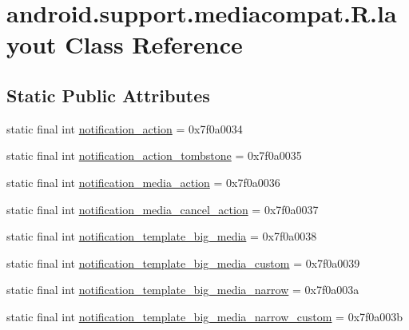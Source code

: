 \hypertarget{classandroid_1_1support_1_1mediacompat_1_1_r_1_1layout}{}\section{android.\+support.\+mediacompat.\+R.\+layout Class Reference}
\label{classandroid_1_1support_1_1mediacompat_1_1_r_1_1layout}
\subsection*{Static Public Attributes}
\begin{DoxyCompactItemize}
\item 
static final int \mbox{\hyperlink{classandroid_1_1support_1_1mediacompat_1_1_r_1_1layout_ab25d299914399f971acb340817848876}{notification\+\_\+action}} = 0x7f0a0034
\item 
static final int \mbox{\hyperlink{classandroid_1_1support_1_1mediacompat_1_1_r_1_1layout_a55962c7fb3b86ebe951cc7a2ca92c207}{notification\+\_\+action\+\_\+tombstone}} = 0x7f0a0035
\item 
static final int \mbox{\hyperlink{classandroid_1_1support_1_1mediacompat_1_1_r_1_1layout_abcade0350ba1b475e850cae81ee3248c}{notification\+\_\+media\+\_\+action}} = 0x7f0a0036
\item 
static final int \mbox{\hyperlink{classandroid_1_1support_1_1mediacompat_1_1_r_1_1layout_a0478c67fc8c1d467283f34208e912544}{notification\+\_\+media\+\_\+cancel\+\_\+action}} = 0x7f0a0037
\item 
static final int \mbox{\hyperlink{classandroid_1_1support_1_1mediacompat_1_1_r_1_1layout_a3e35d67668e93a2231704b7d96670c8a}{notification\+\_\+template\+\_\+big\+\_\+media}} = 0x7f0a0038
\item 
static final int \mbox{\hyperlink{classandroid_1_1support_1_1mediacompat_1_1_r_1_1layout_a9011bb386f5b3ed3fc16b1493a2c382d}{notification\+\_\+template\+\_\+big\+\_\+media\+\_\+custom}} = 0x7f0a0039
\item 
static final int \mbox{\hyperlink{classandroid_1_1support_1_1mediacompat_1_1_r_1_1layout_af4df4ca0ed9f4fd959614bf1aacd732a}{notification\+\_\+template\+\_\+big\+\_\+media\+\_\+narrow}} = 0x7f0a003a
\item 
static final int \mbox{\hyperlink{classandroid_1_1support_1_1mediacompat_1_1_r_1_1layout_aa1f59330e7339efaabd3ff44b2b4141d}{notification\+\_\+template\+\_\+big\+\_\+media\+\_\+narrow\+\_\+custom}} = 0x7f0a003b
\item 

\end{DoxyCompactItemize}

